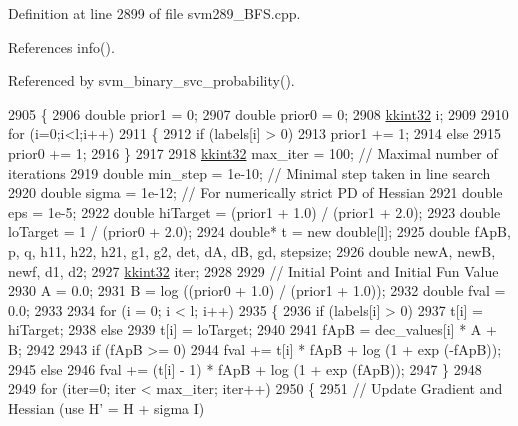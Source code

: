 Definition at line 2899 of file svm289\+\_\+\+B\+F\+S.\+cpp.



References info().



Referenced by svm\+\_\+binary\+\_\+svc\+\_\+probability().


\begin{DoxyCode}
2905 \{
2906   \textcolor{keywordtype}{double}  prior1 = 0;
2907   \textcolor{keywordtype}{double}  prior0 = 0;
2908   \hyperlink{namespace_k_k_b_a8fa4952cc84fda1de4bec1fbdd8d5b1b}{kkint32} i;
2909 
2910   \textcolor{keywordflow}{for} (i=0;i<l;i++)
2911   \{
2912     \textcolor{keywordflow}{if}  (labels[i] > 0)
2913       prior1 += 1;
2914     \textcolor{keywordflow}{else} 
2915       prior0 += 1;
2916   \}
2917 
2918   \hyperlink{namespace_k_k_b_a8fa4952cc84fda1de4bec1fbdd8d5b1b}{kkint32} max\_iter  = 100;    \textcolor{comment}{// Maximal number of iterations}
2919   \textcolor{keywordtype}{double}  min\_step  = 1e-10;  \textcolor{comment}{// Minimal step taken in line search}
2920   \textcolor{keywordtype}{double}  sigma     = 1e-12;  \textcolor{comment}{// For numerically strict PD of Hessian}
2921   \textcolor{keywordtype}{double}  eps       = 1e-5;
2922   \textcolor{keywordtype}{double}  hiTarget  = (prior1 + 1.0) / (prior1 + 2.0);
2923   \textcolor{keywordtype}{double}  loTarget  =  1 / (prior0 + 2.0);
2924   \textcolor{keywordtype}{double}* t = \textcolor{keyword}{new} \textcolor{keywordtype}{double}[l];
2925   \textcolor{keywordtype}{double}  fApB, p, q, h11, h22, h21, g1, g2, det, dA, dB, gd, stepsize;
2926   \textcolor{keywordtype}{double}  newA, newB, newf, d1, d2;
2927   \hyperlink{namespace_k_k_b_a8fa4952cc84fda1de4bec1fbdd8d5b1b}{kkint32} iter; 
2928   
2929   \textcolor{comment}{// Initial Point and Initial Fun Value}
2930   A = 0.0; 
2931   B = log ((prior0 + 1.0) / (prior1 + 1.0));
2932   \textcolor{keywordtype}{double}  fval = 0.0;
2933 
2934   \textcolor{keywordflow}{for}  (i = 0;  i < l;  i++)
2935   \{
2936     \textcolor{keywordflow}{if}  (labels[i] > 0) 
2937       t[i] = hiTarget;
2938     \textcolor{keywordflow}{else} 
2939       t[i] = loTarget;
2940 
2941     fApB = dec\_values[i] * A + B;
2942     
2943     \textcolor{keywordflow}{if} (fApB >= 0)
2944       fval += t[i] * fApB + log (1 + exp (-fApB));
2945     \textcolor{keywordflow}{else}
2946       fval += (t[i] - 1) * fApB + log (1 + exp (fApB));
2947   \}
2948 
2949   \textcolor{keywordflow}{for}  (iter=0;  iter < max\_iter;  iter++)
2950   \{
2951     \textcolor{comment}{// Update Gradient and Hessian (use H' = H + sigma I)}

\end{DoxyCode}
